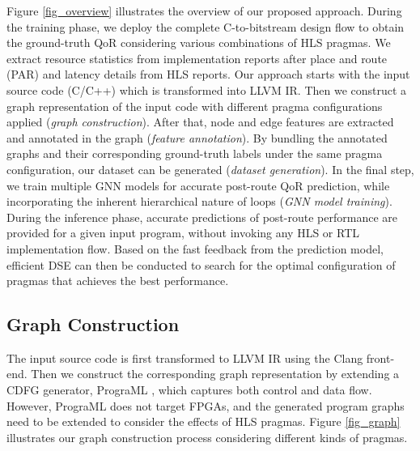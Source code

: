 \documentclass[conference]{IEEEtran}
\begin{document}
Figure \ref{fig_overview} illustrates the overview of our proposed approach. 
During the training phase, we deploy the complete C-to-bitstream design flow to obtain the ground-truth QoR considering various combinations of HLS pragmas. We extract resource statistics from implementation reports after place and route (PAR) and latency details from HLS reports. Our approach starts with the input source code (C/C++) which is transformed into LLVM IR. Then we construct a graph representation of the input code with different pragma configurations applied (\textit{graph construction}). After that, node and edge features are extracted and annotated in the graph (\textit{feature annotation}). By bundling the annotated graphs and their corresponding ground-truth labels under the same pragma configuration, our dataset can be generated (\textit{dataset generation}). In the final step, we train multiple GNN models for accurate post-route QoR prediction, while incorporating the inherent hierarchical nature of loops (\textit{GNN model training}). 
During the inference phase, accurate predictions of post-route performance are provided for a given input program, without invoking any HLS or RTL implementation flow. Based on the fast feedback from the prediction model, efficient DSE can then be conducted to search for the optimal configuration of pragmas that achieves the best performance. 

\vspace{-0.1cm}
\subsection{Graph Construction} \label{sec:graph contruction}
\vspace{-0.1cm} 

The input source code is first transformed to LLVM IR using the Clang front-end. Then we construct the corresponding graph representation by extending a CDFG generator, PrograML \cite{cummins2021a}, which captures both control and data flow. However, PrograML does not target FPGAs, and the generated program graphs need to be extended to consider the effects of HLS pragmas. Figure \ref{fig_graph} illustrates our graph construction process considering different kinds of pragmas.
\end{document}
